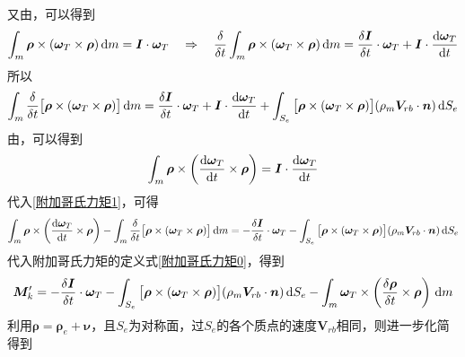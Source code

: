 又由\peref[角动量]，可以得到
\begin{equation}
	\int_m \bm{\rho} \times (\bm{\omega}_T \times \bm{\rho}) \, {\rm{d}} m = \bm{I}\cdot \bm{\omega}_T \quad \Rightarrow \quad \dfrac{\delta }{\delta t}\int_m \bm{\rho} \times (\bm{\omega}_T \times \bm{\rho}) \, {\rm{d}} m = \dfrac{\delta \bm{I}}{\delta t} \cdot \bm{\omega}_T + \bm{I} \cdot \dfrac{{\rm{d}} \bm{\omega}_T}{{\rm{d}} t}
\end{equation}
所以
\begin{equation}
	\int_m \dfrac{\delta}{\delta t}\big[\bm{\rho}\times (\bm{\omega}_T \times \bm{\rho})\big] \, {\rm{d}} m = \dfrac{\delta \bm{I}}{\delta t} \cdot \bm{\omega}_T + \bm{I} \cdot \dfrac{{\rm{d}} \bm{\omega}_T}{{\rm{d}} t} + \int_{S_e} \big[\bm{\rho}\times (\bm{\omega}_T \times \bm{\rho})\big](\rho_m \bm{V}_{rb}\cdot \bm{n}) \, {\rm{d}} S_e
	\label{附加哥氏力矩1}
\end{equation}
由\peref[角动量导]，可以得到
\begin{equation}
	\int_m \bm{\rho} \times \left(\dfrac{{\rm{d}} \bm{\omega}_T}{{\rm{d}} t} \times \bm{\rho}\right) = \bm{I}\cdot \dfrac{{\rm{d}} \bm{\omega}_T}{{\rm{d}} t}
\end{equation}
代入\eqref{附加哥氏力矩1}，可得
\begin{equation}
	\int_m \bm{\rho} \times \left(\dfrac{{\rm{d}} \bm{\omega}_T}{{\rm{d}} t} \times \bm{\rho}\right) - \int_m \dfrac{\delta}{\delta t}\big[\bm{\rho}\times (\bm{\omega}_T \times \bm{\rho})\big] \, {\rm{d}} m  = -\dfrac{\delta \bm{I}}{\delta t} \cdot \bm{\omega}_T - \int_{S_e} \big[\bm{\rho}\times (\bm{\omega}_T \times \bm{\rho})\big](\rho_m \bm{V}_{rb}\cdot \bm{n}) \, {\rm{d}} S_e
\end{equation}
代入附加哥氏力矩的定义式\eqref{附加哥氏力矩0}，得到
\begin{equation}
	\bm{M}'_k = -\dfrac{\delta \bm{I}}{\delta t} \cdot \bm{\omega}_T - \int_{S_e} \big[\bm{\rho}\times (\bm{\omega}_T \times \bm{\rho})\big](\rho_m \bm{V}_{rb}\cdot \bm{n}) \, {\rm{d}} S_e - \int_m \bm{\omega}_T \times \left(\dfrac{\delta \bm{\rho}}{\delta t} \times \bm{\rho}\right) \, {\rm{d}} m
\end{equation}
利用$\bm{\rho} = \bm{\rho}_e + \bm{\nu}$，且$S_e$为对称面，过$S_e$的各个质点的速度$\bm{V}_{rb}$相同，则进一步化简得到

